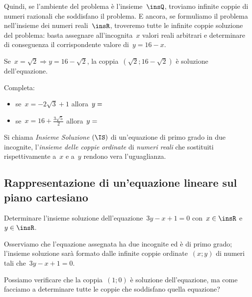 \begin{soluzione}
Quindi, se l'ambiente del problema è
l'insieme~$\insQ$, troviamo infinite coppie di
numeri razionali che soddisfano il problema.
E ancora, se formuliamo il problema nell'insieme dei
numeri reali~$\insR$, troveremo tutte le infinite coppie
soluzione del problema: basta assegnare all'incognita~$x$
valori reali arbitrari e determinare di conseguenza il corrispondente
valore di~$y=16-x$.

Se~$x=\sqrt{2}\Rightarrow y=16-\sqrt{2}$, la 
coppia~$\left(\sqrt{2};16-\sqrt{2}\right)$ è soluzione
dell'equazione. 


Completa:

\begin{itemize}
\item se~$x=-2\sqrt{3}+1$ allora~$y=\dotfill$
\item se~$x=16+\frac{3\sqrt{5}}{2}$ allora~$y=\dotfill$
\end{itemize}
\end{soluzione}

\begin{definizione}
Si chiama \emph{Insieme Soluzione} $(\IS)$ di un'equazione di primo
grado in due incognite, l'\emph{insieme delle coppie
ordinate} di \emph{numeri reali} che sostituiti rispettivamente a~$x$ e
a~$y$ rendono vera l'uguaglianza.
\end{definizione}


\subsection{Rappresentazione di un'equazione lineare sul piano cartesiano}

 \begin{esempio}
Determinare l'insieme soluzione dell'equazione~$3y-x+1=0$ con~$x\in\insR$ 
e~$y\in\insR$.
 \end{esempio}
Osserviamo che l'equazione assegnata ha due incognite ed
è di primo grado; l'insieme soluzione sarà formato
dalle infinite coppie ordinate~$(x;y)$ di numeri tali che~$3y-x+1=0$.

Possiamo verificare che la coppia~$(1;0)$ è soluzione
dell'equazione, ma come facciamo a determinare tutte le
coppie che soddisfano quella equazione?

